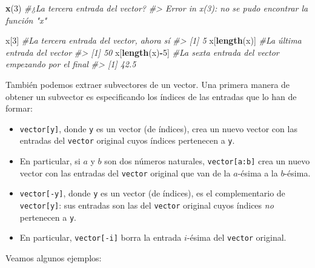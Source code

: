\documentclass[
]{book}
\newenvironment{Shaded}{\begin{snugshade}}{\end{snugshade}}
\newcommand{\CommentTok}[1]{\textcolor[rgb]{0.56,0.35,0.01}{\textit{#1}}}
\newcommand{\DecValTok}[1]{\textcolor[rgb]{0.00,0.00,0.81}{#1}}
\newcommand{\KeywordTok}[1]{\textcolor[rgb]{0.13,0.29,0.53}{\textbf{#1}}}
\newcommand{\NormalTok}[1]{#1}
\newcommand{\OperatorTok}[1]{\textcolor[rgb]{0.81,0.36,0.00}{\textbf{#1}}}
\providecommand{\tightlist}{%
  \setlength{\itemsep}{0pt}\setlength{\parskip}{0pt}}
\theoremstyle{definition}
\theoremstyle{definition}
\theoremstyle{definition}
\theoremstyle{remark}
\begin{document}
\begin{Shaded}
\begin{Highlighting}[]
\KeywordTok{x}\NormalTok{(}\DecValTok{3}\NormalTok{) }\CommentTok{\#¿La tercera entrada del vector?}
\CommentTok{\#\textgreater{} Error in x(3): no se pudo encontrar la función "x"}
\end{Highlighting}
\end{Shaded}

\begin{Shaded}
\begin{Highlighting}[]
\NormalTok{x[}\DecValTok{3}\NormalTok{] }\CommentTok{\#La tercera entrada del vector, ahora sí}
\CommentTok{\#\textgreater{} [1] 5}
\NormalTok{x[}\KeywordTok{length}\NormalTok{(x)]  }\CommentTok{\#La última entrada del vector}
\CommentTok{\#\textgreater{} [1] 50}
\NormalTok{x[}\KeywordTok{length}\NormalTok{(x)}\OperatorTok{{-}}\DecValTok{5}\NormalTok{] }\CommentTok{\#La sexta entrada del vector empezando por el final}
\CommentTok{\#\textgreater{} [1] 42.5}
\end{Highlighting}
\end{Shaded}

También podemos extraer subvectores de un vector. Una primera manera de obtener un subvector es especificando los índices de las entradas que lo han de formar:

\begin{itemize}
\tightlist
\item
  \texttt{vector{[}y{]}}, donde \texttt{y} es un vector (de índices), crea un nuevo vector con las entradas del \texttt{vector} original cuyos índices pertenecen a \texttt{y}.
\item
  En particular, si \(a\) y \(b\) son dos números naturales, \texttt{vector{[}a:b{]}} crea un nuevo vector con las entradas del \texttt{vector} original que van de la \(a\)-ésima a la \(b\)-ésima.
\item
  \texttt{vector{[}-y{]}}, donde \texttt{y} es un vector (de índices), es el complementario de \texttt{vector{[}y{]}}: sus entradas son las del \texttt{vector} original cuyos índices \emph{no} pertenecen a \texttt{y}.
\item
  En particular, \texttt{vector{[}-i{]}} borra la entrada \(i\)-ésima del \texttt{vector} original.
\end{itemize}

Veamos algunos ejemplos:
\end{document}
